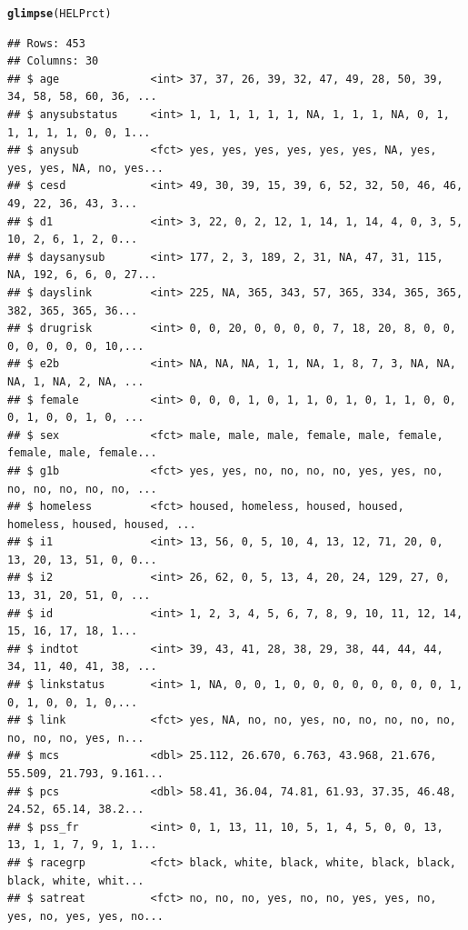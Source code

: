 \documentclass[twoside]{book}\usepackage[]{graphicx}\usepackage[]{xcolor}
\makeatletter
\newcommand{\hlstd}[1]{\textcolor[rgb]{0.345,0.345,0.345}{#1}}%
\newcommand{\hlkwd}[1]{\textcolor[rgb]{0.737,0.353,0.396}{\textbf{#1}}}%
\newenvironment{kframe}{%
 \def\at@end@of@kframe{}%
 \ifinner\ifhmode%
  \def\at@end@of@kframe{\end{minipage}}%
  \begin{minipage}{\columnwidth}%
 \fi\fi%
 \def\FrameCommand##1{\hskip\@totalleftmargin \hskip-\fboxsep
 \colorbox{shadecolor}{##1}\hskip-\fboxsep
     \hskip-\linewidth \hskip-\@totalleftmargin \hskip\columnwidth}%
 \MakeFramed {\advance\hsize-\width
   \@totalleftmargin\z@ \linewidth\hsize
   \@setminipage}}%
 {\par\unskip\endMakeFramed%
 \at@end@of@kframe}
\newenvironment{knitrout}{}{} %
\makeatother
\begin{document}
\begin{knitrout}
\color{fgcolor}\begin{kframe}
\begin{alltt}
\hlkwd{glimpse}\hlstd{(HELPrct)}
\end{alltt}
\begin{verbatim}
## Rows: 453
## Columns: 30
## $ age              <int> 37, 37, 26, 39, 32, 47, 49, 28, 50, 39, 34, 58, 58, 60, 36, ...
## $ anysubstatus     <int> 1, 1, 1, 1, 1, 1, NA, 1, 1, 1, NA, 0, 1, 1, 1, 1, 1, 0, 0, 1...
## $ anysub           <fct> yes, yes, yes, yes, yes, yes, NA, yes, yes, yes, NA, no, yes...
## $ cesd             <int> 49, 30, 39, 15, 39, 6, 52, 32, 50, 46, 46, 49, 22, 36, 43, 3...
## $ d1               <int> 3, 22, 0, 2, 12, 1, 14, 1, 14, 4, 0, 3, 5, 10, 2, 6, 1, 2, 0...
## $ daysanysub       <int> 177, 2, 3, 189, 2, 31, NA, 47, 31, 115, NA, 192, 6, 6, 0, 27...
## $ dayslink         <int> 225, NA, 365, 343, 57, 365, 334, 365, 365, 382, 365, 365, 36...
## $ drugrisk         <int> 0, 0, 20, 0, 0, 0, 0, 7, 18, 20, 8, 0, 0, 0, 0, 0, 0, 0, 10,...
## $ e2b              <int> NA, NA, NA, 1, 1, NA, 1, 8, 7, 3, NA, NA, NA, 1, NA, 2, NA, ...
## $ female           <int> 0, 0, 0, 1, 0, 1, 1, 0, 1, 0, 1, 1, 0, 0, 0, 1, 0, 0, 1, 0, ...
## $ sex              <fct> male, male, male, female, male, female, female, male, female...
## $ g1b              <fct> yes, yes, no, no, no, no, yes, yes, no, no, no, no, no, no, ...
## $ homeless         <fct> housed, homeless, housed, housed, homeless, housed, housed, ...
## $ i1               <int> 13, 56, 0, 5, 10, 4, 13, 12, 71, 20, 0, 13, 20, 13, 51, 0, 0...
## $ i2               <int> 26, 62, 0, 5, 13, 4, 20, 24, 129, 27, 0, 13, 31, 20, 51, 0, ...
## $ id               <int> 1, 2, 3, 4, 5, 6, 7, 8, 9, 10, 11, 12, 14, 15, 16, 17, 18, 1...
## $ indtot           <int> 39, 43, 41, 28, 38, 29, 38, 44, 44, 44, 34, 11, 40, 41, 38, ...
## $ linkstatus       <int> 1, NA, 0, 0, 1, 0, 0, 0, 0, 0, 0, 0, 0, 1, 0, 1, 0, 0, 1, 0,...
## $ link             <fct> yes, NA, no, no, yes, no, no, no, no, no, no, no, no, yes, n...
## $ mcs              <dbl> 25.112, 26.670, 6.763, 43.968, 21.676, 55.509, 21.793, 9.161...
## $ pcs              <dbl> 58.41, 36.04, 74.81, 61.93, 37.35, 46.48, 24.52, 65.14, 38.2...
## $ pss_fr           <int> 0, 1, 13, 11, 10, 5, 1, 4, 5, 0, 0, 13, 13, 1, 1, 7, 9, 1, 1...
## $ racegrp          <fct> black, white, black, white, black, black, black, white, whit...
## $ satreat          <fct> no, no, no, yes, no, no, yes, yes, no, yes, no, yes, yes, no...

\end{verbatim}
\end{kframe}
\end{knitrout}
\end{document}
